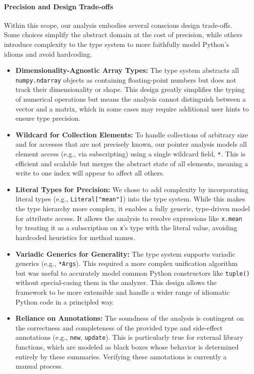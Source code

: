 \paragraph{Precision and Design Trade-offs}
Within this scope, our analysis embodies several conscious design trade-offs. Some choices simplify the abstract domain at the cost of precision, while others introduce complexity to the type system to more faithfully model Python's idioms and avoid hardcoding.
\begin{itemize}
    \item \textbf{Dimensionality-Agnostic Array Types:} The type system abstracts all \texttt{numpy.ndarray} objects as containing floating-point numbers but does not track their dimensionality or shape. This design greatly simplifies the typing of numerical operations but means the analysis cannot distinguish between a vector and a matrix, which in some cases may require additional user hints to ensure type precision.
    \item \textbf{Wildcard for Collection Elements:} To handle collections of arbitrary size and for accesses that are not precisely known, our pointer analysis models all element access (e.g., via subscripting) using a single wildcard field, \texttt{*}. This is efficient and scalable but merges the abstract state of all elements, meaning a write to one index will appear to affect all others.
    \item \textbf{Literal Types for Precision:} We chose to add complexity by incorporating literal types (e.g., \texttt{Literal["mean"]}) into the type system. While this makes the type hierarchy more complex, it enables a fully generic, type-driven model for attribute access. It allows the analysis to resolve expressions like \texttt{x.mean} by treating it as a subscription on \texttt{x}'s type with the literal value, avoiding hardcoded heuristics for method names.
    \item \textbf{Variadic Generics for Generality:} The type system supports variadic generics (e.g., \texttt{*Args}). This required a more complex unification algorithm but was useful to accurately model common Python constructors like \texttt{tuple()} without special-casing them in the analyzer. This design allows the framework to be more extensible and handle a wider range of idiomatic Python code in a principled way.
    \item \textbf{Reliance on Annotations:} The soundness of the analysis is contingent on the correctness and completeness of the provided type and side-effect annotations (e.g., \texttt{new}, \texttt{update}). This is particularly true for external library functions, which are modeled as black boxes whose behavior is determined entirely by these summaries. Verifying these annotations is currently a manual process.
\end{itemize}

